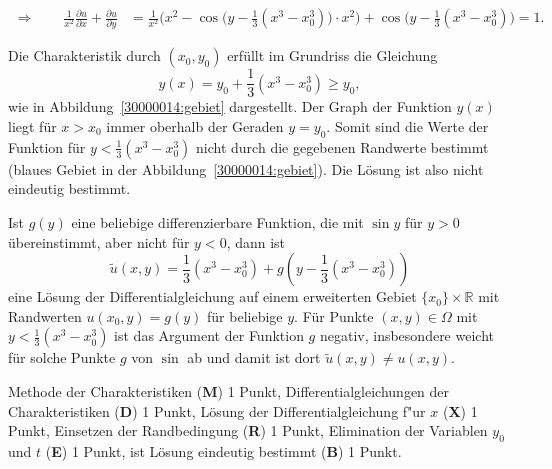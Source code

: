 \begin{loesung}
\begin{teilaufgaben}
\begin{align*}
\Rightarrow
\qquad
\frac1{x^2}
\frac{\partial u}{\partial x}
+
\frac{\partial u}{\partial y}
&=
\frac1{x^2}\biggl(x^2 -
\cos\bigl(y-{\textstyle\frac13}(x^3-x_0^3)\bigr)
\cdot x^2\biggr)
+
\cos\bigl(y-{\textstyle\frac13}(x^3-x_0^3)\bigr)
=1.
\end{align*}
\item
Die Charakteristik durch $(x_0,y_0)$ erfüllt im Grundriss die Gleichung
\[
y(x)
=
y_0 + {\textstyle\frac13}(x^3-x_0^3)
\ge
y_0,
\]
wie in Abbildung~\ref{30000014:gebiet} dargestellt.
Der Graph der Funktion $y(x)$ liegt für $x>x_0$ immer oberhalb der
Geraden $y=y_0$.
Somit sind die Werte der Funktion für $y < {\textstyle\frac13}(x^3-x_0^3)$
nicht durch die gegebenen Randwerte bestimmt (blaues Gebiet in der
Abbildung~\ref{30000014:gebiet}).
Die Lösung ist also nicht eindeutig bestimmt.
\qedhere
\end{teilaufgaben}
\end{loesung}

\begin{diskussion}
Ist $g(y)$ eine beliebige differenzierbare Funktion, die mit $\sin y$ 
für $y>0$ übereinstimmt, aber nicht für $y<0$, dann ist
\[
\tilde u(x,y) = {\textstyle\frac13}(x^3-x_0^3) + g(y-{\textstyle\frac13}(x^3-x_0^3))
\]
eine Lösung der Differentialgleichung auf einem erweiterten Gebiet
$\{x_0\}\times \mathbb R$ mit Randwerten $u(x_0,y)=g(y)$ für beliebige $y$.
Für Punkte $(x,y)\in\Omega$ mit $y<{\textstyle\frac13}(x^3-x_0^3)$
ist das Argument
der Funktion $g$ negativ, insbesondere weicht für solche Punkte $g$ von
$\sin$ ab und damit ist dort $\tilde u(x,y)\ne u(x,y)$.
\end{diskussion}

\begin{bewertung}
Methode der Charakteristiken ({\bf M}) 1 Punkt,
Differentialgleichungen der Charakteristiken ({\bf D}) 1 Punkt,
Lösung der Differentialgleichung f"ur $x$ ({\bf X}) 1 Punkt,
Einsetzen der Randbedingung ({\bf R}) 1 Punkt,
Elimination der Variablen $y_0$ und $t$ ({\bf E}) 1 Punkt,
ist Lösung eindeutig bestimmt ({\bf B}) 1 Punkt.
\end{bewertung}



